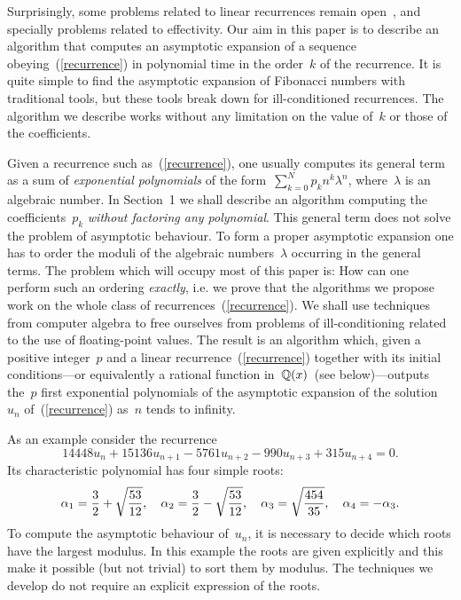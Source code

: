 Surprisingly, some   problems related  to linear recurrences
remain   open~\cite{CeMiPi87},    and  specially problems   related to
effectivity.  Our aim in this paper is  to describe an  algorithm that
computes    an    asymptotic        expansion    of    a      sequence
obeying~(\ref{recurrence}) in polynomial time in the order~$k$ of the
recurrence.   It is  quite simple to find the 
asymptotic expansion of 
Fibonacci numbers with traditional  tools, but these  tools break down
for ill-conditioned recurrences.   The  algorithm we
describe works without any limitation on  the value of~$k$ or those of
the coefficients.

Given a recurrence such as~(\ref{recurrence}), one usually computes
its general term as a sum of {\em exponential polynomials\/} of the
form~$\sum_{k=0}^N{p_kn^k}\lambda^n$,
where~$\lambda$ is an algebraic number. In Section~1 we shall describe
an algorithm computing the coefficients~$p_k$ {\em without factoring
any polynomial}. This general term does not solve the problem of
asymptotic behaviour. To form a proper asymptotic expansion one has to
order the moduli of the algebraic numbers~$\lambda$ occurring in the
general terms. The problem which will occupy most of this paper is:
How can one perform such an ordering {\em exactly}, i.e. we prove that
the algorithms we propose work on the whole class of
recurrences~(\ref{recurrence}).
We shall  use techniques from    computer algebra to free   ourselves  from
problems  of ill-conditioning related  to  the use   of floating-point
values.    The  result is  an  algorithm   which,  given   a  positive
integer~$p$  and  a linear recurrence~(\ref{recurrence})  together
with its initial   conditions---or    equivalently     a    rational
function in~${\Bbb Q}(x)$~(see below)---outputs the~$p$ first exponential
polynomials of the asymptotic expansion of  the solution~$u_n$
of~(\ref{recurrence}) as~$n$ tends to infinity.

As an example consider the recurrence
\begin{equation}\label{example1}
14448 u_{n}+15136 u_{n+1}-5761 u_{n+2} -990 u_{n+3}+315u_{n+4}=0.

\end{equation}
Its characteristic polynomial has four simple roots:
$$\alpha_1={3\over 2} + \sqrt{53\over 12},\quad 
\alpha_2={3\over 2} - \sqrt{53\over 12}, \quad
\alpha_3=\sqrt{454\over 35},\quad \alpha_4=-\alpha_3.$$
To compute the asymptotic behaviour of~$u_n$, it is necessary to
decide which roots have the largest modulus. In this example the roots
are given explicitly and this make it possible (but not trivial) to
sort them by modulus. The techniques we develop do not require an explicit
expression of the roots.

